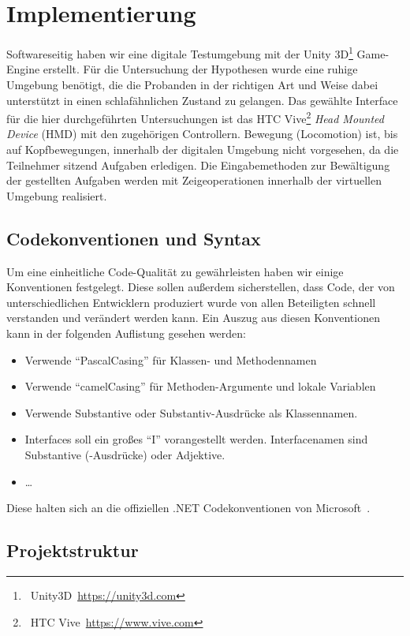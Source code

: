 \section{Implementierung}

Softwareseitig haben wir eine digitale Testumgebung mit der Unity 3D\footnote{~Unity3D~\url{https://unity3d.com}} Game-Engine erstellt. Für die Untersuchung der Hypothesen wurde eine ruhige Umgebung benötigt, die die Probanden in der richtigen Art und Weise dabei unterstützt in einen schlafähnlichen Zustand zu gelangen. 
Das gewählte Interface für die hier durchgeführten Untersuchungen ist das HTC Vive\footnote{~HTC Vive~\url{https://www.vive.com}} \textit{Head Mounted Device} (HMD) mit den zugehörigen Controllern. 
Bewegung (Locomotion) ist, bis auf Kopfbewegungen, innerhalb der digitalen Umgebung nicht vorgesehen, da die Teilnehmer sitzend Aufgaben erledigen. 
Die Eingabemethoden zur Bewältigung der gestellten Aufgaben werden mit Zeigeoperationen innerhalb der virtuellen Umgebung realisiert. 

\subsection{Codekonventionen und Syntax}

Um eine einheitliche Code-Qualität zu gewährleisten haben wir einige Konventionen festgelegt. Diese sollen außerdem sicherstellen, dass Code, der von unterschiedlichen Entwicklern produziert wurde von allen Beteiligten schnell verstanden und verändert werden kann.
Ein Auszug aus diesen Konventionen kann in der folgenden Auflistung gesehen werden: 
\begin{itemize}
    \item Verwende "`PascalCasing"' für Klassen- und Methodennamen
    \item Verwende "`camelCasing"' für Methoden-Argumente und lokale Variablen
    \item Verwende Substantive oder Substantiv-Ausdrücke als Klassennamen.
    \item Interfaces soll ein großes "`I"' vorangestellt werden. Interfacenamen sind Substantive (-Ausdrücke) oder Adjektive.
    \item \ldots
\end{itemize}

Diese halten sich an die offiziellen .NET Codekonventionen von Microsoft~\cite{online:condeConventions}.

\subsection{Projektstruktur}


